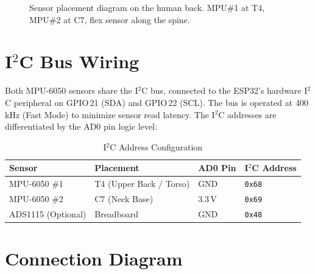 \documentclass[12pt,a4paper]{report}
\newcommand{\code}[1]{\texttt{\small\color{accentviolet}#1}}
\begin{document}
\begin{figure}[H]
\caption{Sensor placement diagram on the human back. MPU\#1 at T4, MPU\#2 at C7, flex sensor along the spine.}
\label{fig:placement}
\end{figure}

\section{I$^2$C Bus Wiring}

Both MPU-6050 sensors share the I$^2$C bus, connected to the ESP32's hardware I$^2$C peripheral on GPIO\,21 (SDA) and GPIO\,22 (SCL). The bus is operated at 400\,kHz (Fast Mode) to minimize sensor read latency. The I$^2$C addresses are differentiated by the AD0 pin logic level:

\begin{table}[H]
\centering
\caption{I$^2$C Address Configuration}
\label{tab:i2c}
\begin{tabular}{llll}
\toprule
\textbf{Sensor} & \textbf{Placement} & \textbf{AD0 Pin} & \textbf{I$^2$C Address} \\
\midrule
MPU-6050 \#1 & T4 (Upper Back / Torso) & GND   & \code{0x68} \\
MPU-6050 \#2 & C7 (Neck Base)          & 3.3\,V & \code{0x69} \\
ADS1115 (Optional) & Breadboard       & GND   & \code{0x48} \\
\bottomrule
\end{tabular}
\end{table}

\section{Connection Diagram}
\end{document}
